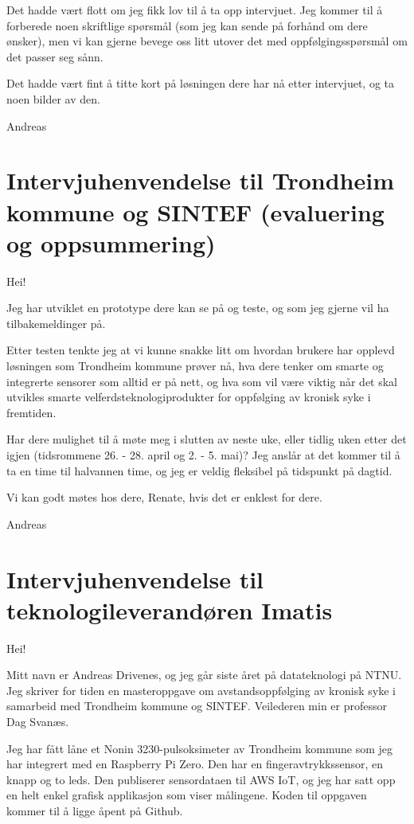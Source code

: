 Det hadde vært flott om jeg fikk lov til å ta opp intervjuet. Jeg kommer til å forberede noen skriftlige spørsmål
(som jeg kan sende på forhånd om dere ønsker),
men vi kan gjerne bevege oss litt utover det med oppfølgingsspørsmål om det passer seg sånn. 

Det hadde vært fint å titte kort på løsningen dere har nå etter intervjuet, og ta noen bilder av den.

Andreas

\section{Intervjuhenvendelse til Trondheim kommune og SINTEF (evaluering og oppsummering)}
Hei! 

Jeg har utviklet en prototype dere kan se på og teste, og som jeg gjerne vil ha tilbakemeldinger på.

Etter testen tenkte jeg at vi kunne snakke litt om hvordan brukere har opplevd løsningen som Trondheim kommune prøver nå, hva dere tenker om smarte
og integrerte sensorer som alltid er på nett, og hva som vil være viktig når det skal utvikles smarte velferdsteknologiprodukter for oppfølging av
kronisk syke i fremtiden.

Har dere mulighet til å møte meg i slutten av neste uke, eller tidlig uken etter det igjen (tidsrommene 26. - 28. april og 2. - 5. mai)? Jeg anslår
at det kommer til å ta en time til halvannen time, og jeg er veldig fleksibel på tidspunkt på dagtid. 

Vi kan godt møtes hos dere, Renate, hvis det er enklest for dere.

Andreas

\section{Intervjuhenvendelse til teknologileverandøren Imatis}
Hei! 

Mitt navn er Andreas Drivenes, og jeg går siste året på datateknologi på NTNU. Jeg skriver for tiden en masteroppgave
om avstandsoppfølging av kronisk syke i samarbeid med Trondheim kommune og SINTEF. Veilederen min er professor Dag Svanæs.

Jeg har fått låne et Nonin 3230-pulsoksimeter av Trondheim kommune som jeg har integrert med en Raspberry Pi Zero.
Den har en fingeravtrykkssensor, en knapp og to leds. Den publiserer sensordataen til AWS IoT, og jeg har satt opp en helt
enkel grafisk applikasjon som viser målingene. Koden til oppgaven kommer til å ligge åpent på Github.

